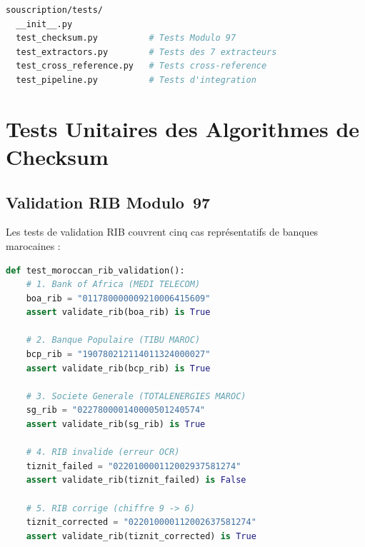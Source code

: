 \begin{lstlisting}[language=bash, caption={Organisation des fichiers de test.}, label={lst:test-structure}]
souscription/tests/
  __init__.py
  test_checksum.py          # Tests Modulo 97
  test_extractors.py        # Tests des 7 extracteurs
  test_cross_reference.py   # Tests cross-reference
  test_pipeline.py          # Tests d'integration
\end{lstlisting}

\section{Tests Unitaires des Algorithmes de Checksum}

\subsection{Validation RIB Modulo~97}

Les tests de validation RIB couvrent cinq cas repr\'{e}sentatifs de banques marocaines :

\begin{lstlisting}[language=Python, caption={Tests unitaires de validation RIB (test\_checksum.py).}, label={lst:test-rib}]
def test_moroccan_rib_validation():
    # 1. Bank of Africa (MEDI TELECOM)
    boa_rib = "011780000009210006415609"
    assert validate_rib(boa_rib) is True
    
    # 2. Banque Populaire (TIBU MAROC)
    bcp_rib = "190780212114011324000027"
    assert validate_rib(bcp_rib) is True
    
    # 3. Societe Generale (TOTALENERGIES MAROC)
    sg_rib = "022780000140000501240574"
    assert validate_rib(sg_rib) is True
    
    # 4. RIB invalide (erreur OCR)
    tiznit_failed = "022010000112002937581274"
    assert validate_rib(tiznit_failed) is False
    
    # 5. RIB corrige (chiffre 9 -> 6)
    tiznit_corrected = "022010000112002637581274"
    assert validate_rib(tiznit_corrected) is True
\end{lstlisting}

